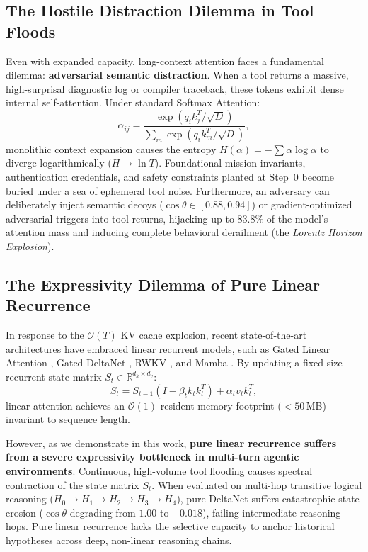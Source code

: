 \documentclass[11pt,letterpaper]{article}
\theoremstyle{definition}
\begin{document}
\subsection{The Hostile Distraction Dilemma in Tool Floods}
Even with expanded capacity, long-context attention faces a fundamental dilemma: \textbf{adversarial semantic distraction}. When a tool returns a massive, high-surprisal diagnostic log or compiler traceback, these tokens exhibit dense internal self-attention. Under standard Softmax Attention:
\begin{equation}
    \alpha_{ij} = \frac{\exp(q_i k_j^T / \sqrt{D})}{\sum_{m} \exp(q_i k_m^T / \sqrt{D})},
\end{equation}
monolithic context expansion causes the entropy $H(\alpha) = -\sum \alpha \log \alpha$ to diverge logarithmically ($H \to \ln T$). Foundational mission invariants, authentication credentials, and safety constraints planted at Step~0 become buried under a sea of ephemeral tool noise. Furthermore, an adversary can deliberately inject semantic decoys ($\cos \theta \in [0.88, 0.94]$) or gradient-optimized adversarial triggers \cite{zou2023gcg, madry2018pgd} into tool returns, hijacking up to $83.8\%$ of the model's attention mass and inducing complete behavioral derailment (the \emph{Lorentz Horizon Explosion}).

\subsection{The Expressivity Dilemma of Pure Linear Recurrence}
In response to the $\mathcal{O}(T)$ KV cache explosion, recent state-of-the-art architectures have embraced linear recurrent models, such as Gated Linear Attention \cite{yang2023gla}, Gated DeltaNet \cite{yang2024deltanet, yang2024deltanet2}, RWKV \cite{peng2023rwkv}, and Mamba \cite{gu2023mamba}. By updating a fixed-size recurrent state matrix $S_t \in \mathbb{R}^{d_k \times d_v}$:
\begin{equation}
    S_t = S_{t-1} \left( I - \beta_t k_t k_t^T \right) + \alpha_t v_t k_t^T,
\end{equation}
linear attention achieves an $\mathcal{O}(1)$ resident memory footprint ($<50$\,MB) invariant to sequence length. 

However, as we demonstrate in this work, \textbf{pure linear recurrence suffers from a severe expressivity bottleneck in multi-turn agentic environments}. Continuous, high-volume tool flooding causes spectral contraction of the state matrix $S_t$. When evaluated on multi-hop transitive logical reasoning ($H_0 \to H_1 \to H_2 \to H_3 \to H_4$), pure DeltaNet suffers catastrophic state erosion ($\cos \theta$ degrading from $1.00$ to $-0.018$), failing intermediate reasoning hops. Pure linear recurrence lacks the selective capacity to anchor historical hypotheses across deep, non-linear reasoning chains.
\end{document}
